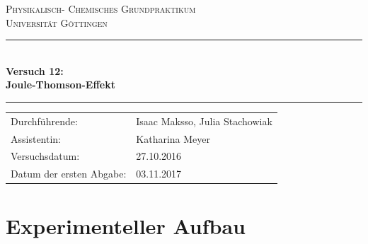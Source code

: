 \documentclass[12pt,a4paper,titlepage,headinclude,bibtotoc]{scrartcl}
\begin{document}
\begin{titlepage}
\centering
\textsc{\Large Physikalisch- Chemisches Grundpraktikum\\[1.5ex] Universität Göttingen}

\vspace*{0.5cm}

\rule{\textwidth}{1pt}\\[0.5cm]
{\huge \bfseries
  Versuch 12: \\[1.5ex]
  Joule-Thomson-Effekt}\\[0.5cm]
\rule{\textwidth}{1pt}

\vspace*{0.5cm}


\begin{Large}
\begin{tabular}{ll}
Durchführende: &  Isaac Maksso, Julia Stachowiak\\
Assistentin: & Katharina Meyer \\
 Versuchsdatum: & 27.10.2016\\
 Datum der ersten Abgabe: & 03.11.2017\\
\end{tabular}
\end{Large}

\vspace*{0.5cm}

\begin{Large}
\end{Large}
\end{titlepage}


\tableofcontents

\newpage


\section{Experimenteller Aufbau}
\end{document}
